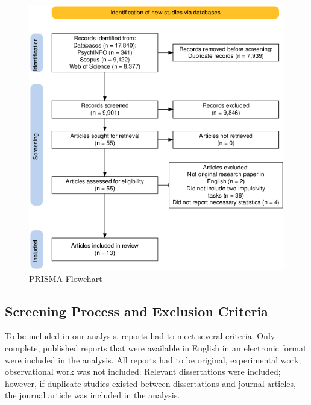 \documentclass[
  ,pub,floatsintext]{apa6}
\begin{document}
\begin{figure}
\caption{\newline PRISMA Flowchart \label{fig:prisma}}
\begin{center}
\includegraphics[width=0.8\linewidth]{"figures/prisma_chart.png"}
\end{center}


\end{figure}

\hypertarget{screening-process-and-exclusion-criteria}{%
\subsection{Screening Process and Exclusion Criteria}\label{screening-process-and-exclusion-criteria}}

To be included in our analysis, reports had to meet several criteria. Only complete, published reports that were available in English in an electronic format were included in the analysis. All reports had to be original, experimental work; observational work was not included. Relevant dissertations were included; however, if duplicate studies existed between dissertations and journal articles, the journal article was included in the analysis.
\end{document}
